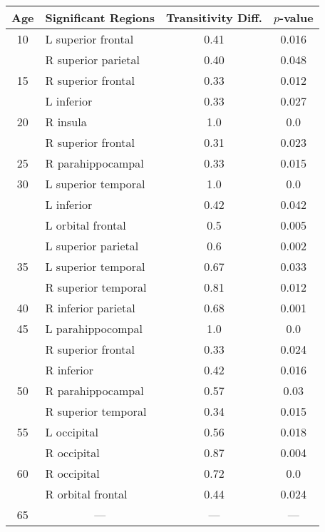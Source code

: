 \begin{table}[htb]
\centering
\begin{tabular}{c l c c}
\toprule
Age & \multicolumn{1}{c}{Significant Regions} & Transitivity Diff. & $p$-value\\
\midrule
\rowcolor{gray!40}
10 & L superior frontal & 0.41 & 0.016 \\
\rowcolor{gray!40}
{} & R superior parietal & 0.40 & 0.048 \\
\rowcolor{gray!20}
15 & R superior frontal & 0.33 & 0.012 \\
\rowcolor{gray!20}
{} & L inferior & 0.33 & 0.027 \\
\rowcolor{gray!40}
20 & R insula & 1.0 & 0.0 \\
\rowcolor{gray!40}
{} & R superior frontal & 0.31 & 0.023 \\
\rowcolor{gray!20}
25 & R parahippocampal & 0.33 & 0.015 \\
\rowcolor{gray!40}
30 & L superior temporal & 1.0 & 0.0 \\
\rowcolor{gray!40}
{} & L inferior & 0.42 & 0.042 \\
\rowcolor{gray!40}
{} & L orbital frontal & 0.5 & 0.005 \\
\rowcolor{gray!40}
{} & L superior parietal & 0.6 & 0.002 \\
\rowcolor{gray!20}
35 & L superior temporal & 0.67 & 0.033 \\
\rowcolor{gray!20}
{} & R superior temporal & 0.81 & 0.012 \\
\rowcolor{gray!40}
40 & R inferior parietal & 0.68 & 0.001 \\
\rowcolor{gray!20}
45 & L parahippocompal & 1.0 & 0.0 \\
\rowcolor{gray!20}
{} & R superior frontal & 0.33 & 0.024 \\
\rowcolor{gray!20}
{} & R inferior & 0.42 & 0.016 \\
\rowcolor{gray!40}
50 & R parahippocampal & 0.57 & 0.03 \\
\rowcolor{gray!40}
{} & R superior temporal & 0.34 & 0.015 \\
\rowcolor{gray!20}
55 & L occipital & 0.56 & 0.018 \\
\rowcolor{gray!20}
{} & R occipital & 0.87 & 0.004 \\
\rowcolor{gray!40}
60 & R occipital & 0.72 & 0.0 \\
\rowcolor{gray!40}
{} & R orbital frontal & 0.44 & 0.024 \\
\rowcolor{gray!20}
65 & \multicolumn{1}{c}{---} & --- & --- \\

\end{tabular}
\end{table}
